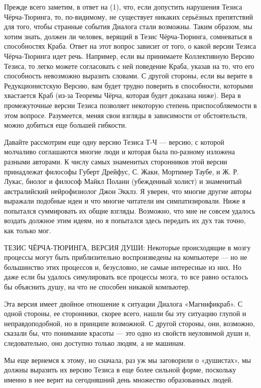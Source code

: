 \documentclass[../main.tex]{subfiles}
\begin{document}
Прежде всего заметим, в ответ на (1), что, если допустить нарушения Тезиса Чёрча-Тюринга, то, по-видимому, не существует никаких серьёзных препятствий для того, чтобы странные события Диалога стали возможны. Таким образом, мы хотим знать, должен ли человек, верящий в Тезис Чёрча-Тюринга, сомневаться в способностях Краба. Ответ на этот вопрос зависит от того, о какой версии Тезиса Чёрча-Тюринга идет речь. Например, если вы принимаете Коллективную Версию Тезиса, то легко можете согласовать с ней поведение Краба, указав на то, что его способность невозможно выразить словами. С другой стороны, если вы верите в Редукционистскую Версию, вам будет трудно поверить в способности, которыми хвастается Краб (из-за Теоремы Чёрча, которая будет доказана ниже). Вера в промежуточные версии Тезиса позволяет некоторую степень приспособляемости в этом вопросе. Разумеется, меняя свои взгляды в зависимости от обстоятельств, можно добиться еще большей гибкости.

Давайте рассмотрим еще одну версию Тезиса Т-Ч --- версию, с которой молчаливо соглашаются многие люди и которая была по-разному изложена разными авторами. К числу самых знаменитых сторонников этой версии принадлежат философы Губерт Дрейфус, С. Жаки, Мортимер Таубе, и Ж. Р. Лукас, биолог и философ Майкл Полани (убежденный холист) и знаменитый австралийский нейрофизиолог Джон Экклз. Я уверен, что многие другие авторы выражали подобные идеи и что многие читатели им симпатизировали. Ниже я попытался суммировать их общие взгляды. Возможно, что мне не совсем удалось воздать должное этим идеям, но я попытался здесь передать их дух так точно, как только мог.

ТЕЗИС ЧЁРЧА-ТЮРИНГА, ВЕРСИЯ ДУШИ: Некоторые происходящие в мозгу процессы могут быть приблизительно воспроизведены на компьютере --- но не большинство этих процессов и, безусловно, не самые интересные из них. Но даже если бы удалось симулировать все процессы мозга, то все равно осталось бы объяснить душу, на что не способен никакой компьютер.

Эта версия имеет двойное отношение к ситуации Диалога «Магнификраб». С одной стороны, ее сторонники, скорее всего, нашли бы эту ситуацию глупой и неправдоподобной, но в принципе возможной. С другой стороны, они, возможно, сказали бы, что понимание красоты --- это одно из свойств неуловимой души и, следовательно, оно доступно только людям, а не машинам.

Мы еще вернемся к этому, но сначала, раз уж мы заговорили о «душистах», мы должны выразить их версию Тезиса в еще более сильной форме, поскольку именно в нее верит на сегодняшний день множество образованных людей.
\end{document}
